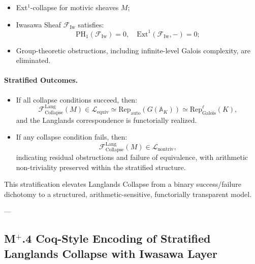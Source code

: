 \documentclass[11pt]{article}
\begin{document}
\begin{itemize}
    \item Ext$^1$-collapse for motivic sheaves \( M \);
    \item Iwasawa Sheaf \( \mathcal{F}_{\mathrm{Iw}} \) satisfies:
    \[
    \mathrm{PH}_1(\mathcal{F}_{\mathrm{Iw}}) = 0, \quad \mathrm{Ext}^1(\mathcal{F}_{\mathrm{Iw}}, -) = 0;
    \]
    \item Group-theoretic obstructions, including infinite-level Galois complexity, are eliminated.
\end{itemize}

\paragraph{Stratified Outcomes.}

\begin{itemize}
    \item If all collapse conditions succeed, then:
    \[
    \mathcal{F}_{\mathrm{Collapse}}^{\mathrm{Lang}}(M) \in \mathcal{L}_{\mathrm{equiv}} \simeq \mathrm{Rep}_{\mathrm{auto}}(G(\mathbb{A}_K)) \simeq \mathrm{Rep}_{\mathrm{Galois}}^\ell(K),
    \]
    and the Langlands correspondence is functorially realized.

    \item If any collapse condition fails, then:
    \[
    \mathcal{F}_{\mathrm{Collapse}}^{\mathrm{Lang}}(M) \in \mathcal{L}_{\mathrm{nontriv}},
    \]
    indicating residual obstructions and failure of equivalence, with arithmetic non-triviality preserved within the stratified structure.
\end{itemize}

This stratification elevates Langlands Collapse from a binary success/failure dichotomy to a structured, arithmetic-sensitive, functorially transparent model.

---

\subsection*{M$^{+}$.4 Coq-Style Encoding of Stratified Langlands Collapse with Iwasawa Layer}
\end{document}
